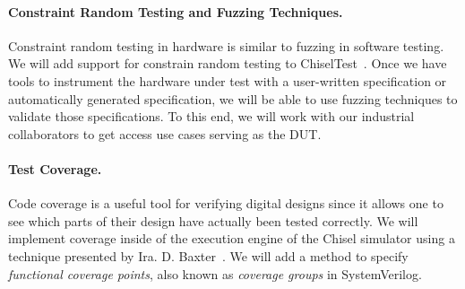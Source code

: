 \documentclass[fleqn,12pt]{article}
\begin{document}
\paragraph{Constraint Random Testing and Fuzzing Techniques.}

Constraint random testing in hardware is similar to fuzzing in software testing.
We will add support for constrain random testing to ChiselTest~\cite{chisel:tester2}.
Once we have tools to instrument the hardware under test with a user-written
specification or automatically generated specification, we will be able to use fuzzing techniques
to validate those specifications. To this end, we will work
with our industrial collaborators to get access use cases serving
as the DUT.

\paragraph{Test Coverage.}

Code coverage is a useful tool for verifying digital designs
since it allows one to see which parts of their design have actually been tested correctly. 
We will implement coverage inside of the execution engine of the Chisel simulator using a technique
presented by Ira. D. Baxter~\cite{branch-cov-made-easy:2002}.
We will add a method to specify \textit{functional coverage points}, also known as
\textit{coverage groups} in SystemVerilog.



%
\end{document}
